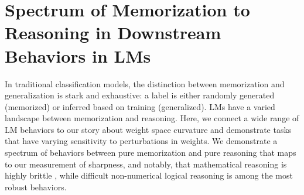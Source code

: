 \documentclass{article} %
\begin{document}
\label{sec:editing_results}
\section{Spectrum of Memorization to Reasoning in Downstream Behaviors in LMs}
\label{sec:downstream}
In traditional classification models, the distinction between memorization and generalization is stark and exhaustive: a label is either randomly generated (memorized) or inferred based on training (generalized). LMs have a varied landscape between memorization and reasoning. Here, we connect a wide range of LM behaviors to our story about weight space curvature and demonstrate tasks that have varying sensitivity to perturbations in weights. We demonstrate a spectrum of behaviors between pure memorization and pure reasoning that maps to our measurement of sharpness, and notably, that mathematical reasoning is highly brittle \citep{nikankinarithmetic}, while difficult non-numerical logical reasoning is among the most robust behaviors.
\end{document}
